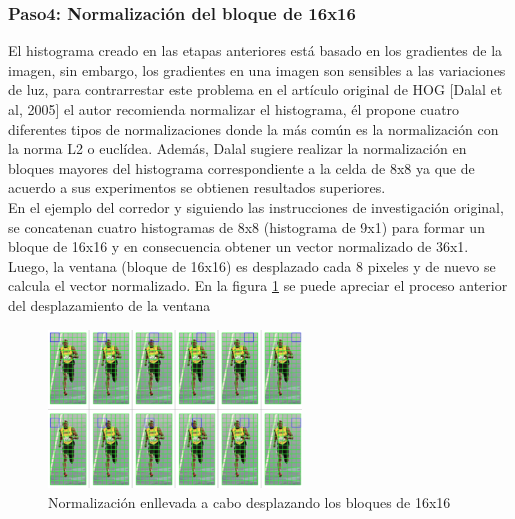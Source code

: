  \subsubsection{Paso4: Normalización del bloque de 16x16}
 El histograma creado en las etapas anteriores está basado en los gradientes de la imagen, sin embargo, los gradientes en una imagen son sensibles a las variaciones de luz, para contrarrestar este problema en el artículo original de HOG [Dalal et al, 2005] el autor recomienda normalizar el histograma, él propone cuatro diferentes tipos de normalizaciones donde la más común es la normalización con la norma L2 o euclídea. Además, Dalal sugiere realizar la normalización en  bloques mayores del histograma correspondiente a la celda de 8x8 ya que de acuerdo a sus experimentos se obtienen resultados superiores.\\
 En el ejemplo del corredor y siguiendo las instrucciones de investigación original, se concatenan cuatro histogramas de 8x8 (histograma de 9x1) para formar un bloque de 16x16 y en consecuencia obtener un vector normalizado de 36x1. Luego, la ventana (bloque de 16x16) es desplazado cada 8 pixeles y de nuevo se calcula el vector normalizado. En la figura \ref{fig: hog16x16Block} se puede apreciar el proceso anterior del desplazamiento de la ventana
 \begin{figure}[htbp]
 	\centering
 	\includegraphics[width=0.6\textwidth]{./pictures/hog16x16Block}
 	\caption{Normalización enllevada a cabo desplazando los bloques de 16x16}\label{fig: hog16x16Block}
 \end{figure}      
     
